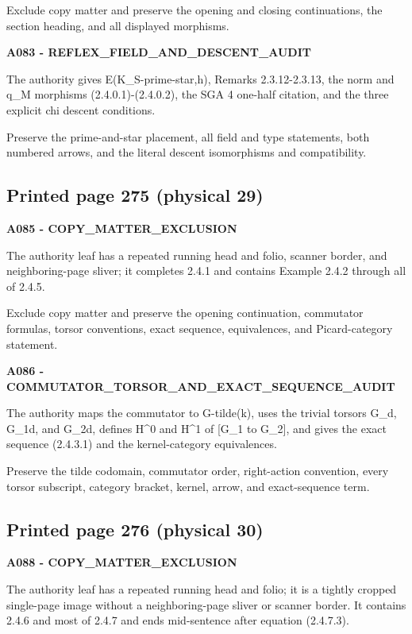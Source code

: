 \documentclass[10pt,a4paper]{article}
\begin{document}
Exclude copy matter and preserve the opening and closing continuations, the section heading, and all displayed morphisms.

\textbf{A083 - REFLEX\_FIELD\_AND\_DESCENT\_AUDIT}

The authority gives E(K\_S-prime-star,h), Remarks 2.3.12-2.3.13, the norm and q\_M morphisms (2.4.0.1)-(2.4.0.2), the SGA 4 one-half citation, and the three explicit chi descent conditions.

Preserve the prime-and-star placement, all field and type statements, both numbered arrows, and the literal descent isomorphisms and compatibility.

\subsection{Printed page 275 (physical 29)}

\textbf{A085 - COPY\_MATTER\_EXCLUSION}

The authority leaf has a repeated running head and folio, scanner border, and neighboring-page sliver; it completes 2.4.1 and contains Example 2.4.2 through all of 2.4.5.

Exclude copy matter and preserve the opening continuation, commutator formulas, torsor conventions, exact sequence, equivalences, and Picard-category statement.

\textbf{A086 - COMMUTATOR\_TORSOR\_AND\_EXACT\_SEQUENCE\_AUDIT}

The authority maps the commutator to G-tilde(k), uses the trivial torsors G\_d, G\_1d, and G\_2d, defines H\^{}0 and H\^{}1 of {[}G\_1 to G\_2{]}, and gives the exact sequence (2.4.3.1) and the kernel-category equivalences.

Preserve the tilde codomain, commutator order, right-action convention, every torsor subscript, category bracket, kernel, arrow, and exact-sequence term.

\subsection{Printed page 276 (physical 30)}

\textbf{A088 - COPY\_MATTER\_EXCLUSION}

The authority leaf has a repeated running head and folio; it is a tightly cropped single-page image without a neighboring-page sliver or scanner border. It contains 2.4.6 and most of 2.4.7 and ends mid-sentence after equation (2.4.7.3).
\end{document}
